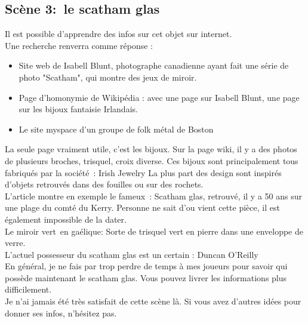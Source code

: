 \documentclass[oneside,12pt]{book}
\begin{document}
\begin{flushleft}
\section{Scène 3: le scatham glas}
Il est possible d'apprendre des infos sur cet objet sur internet.\\
Une recherche renverra comme réponse :
\begin{itemize}
\item Site web de Isabell Blunt, photographe canadienne ayant fait une série de photo "Scatham", qui montre des jeux de miroir.
\item Page d'homonymie de Wikipédia : avec une page sur Isabell Blunt, une page sur les bijoux fantaisie Irlandais. 
\item Le site myspace d'un groupe de folk métal de Boston
\end{itemize}
La seule page vraiment utile, c'est les bijoux.
Sur la page wiki, il y a des photos de plusieurs broches, trisquel, croix diverse. Ces bijoux sont principalement tous fabriqués par la société : Irish Jewelry
La plus part des design sont inspirés d'objets retrouvés dans des fouilles ou sur des rochets.\\
L'article montre en exemple le fameux : Scatham glas, retrouvé, il y a 50 ans sur une plage du comté du Kerry.
Personne ne sait d'ou vient cette pièce, il est également impossible de la dater.\\
Le miroir vert en gaélique: Sorte de trisquel vert en pierre dans une enveloppe de verre.\\
L'actuel possesseur du scatham glas est un certain : Duncan O'Reilly\\

En général, je ne fais par trop perdre de temps à mes joueurs pour savoir qui possède maintenant le scatham glas. Vous pouvez livrer les informations plus difficilement. \\
Je n'ai jamais été très satisfait de cette scène là. Si vous avez d'autres idées pour donner ses infos, n'hésitez pas. \\


\end{flushleft}
\end{document}
